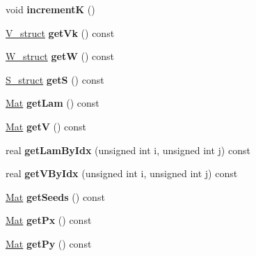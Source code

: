 \begin{DoxyCompactItemize}
void {\bfseries incrementK} ()
\item 
\mbox{\label{classvd_a090bebdbbff36888934c870daf3dcb36}} 
\mbox{\hyperlink{structV__struct}{V\+\_\+struct}} {\bfseries get\+Vk} () const
\item 
\mbox{\label{classvd_ab4d0d9ea76cedf1a6825b62c9ec2d118}} 
\mbox{\hyperlink{structW__struct}{W\+\_\+struct}} {\bfseries getW} () const
\item 
\mbox{\label{classvd_a6b1b73738e720c8ffa2351841c44eabb}} 
\mbox{\hyperlink{structS__struct}{S\+\_\+struct}} {\bfseries getS} () const
\item 
\mbox{\label{classvd_a37c4ab12669eb276fe7fa4a610310345}} 
\mbox{\hyperlink{aux_8h_aa1fe91b8cd36c618282eb0d548690c4c}{Mat}} {\bfseries get\+Lam} () const
\item 
\mbox{\label{classvd_aad4ea5c045b8380f83b0490af2fee0fa}} 
\mbox{\hyperlink{aux_8h_aa1fe91b8cd36c618282eb0d548690c4c}{Mat}} {\bfseries getV} () const
\item 
\mbox{\label{classvd_a1f2400a9f98f649367239f942e3035e8}} 
real {\bfseries get\+Lam\+By\+Idx} (unsigned int i, unsigned int j) const
\item 
\mbox{\label{classvd_af5dbddcd8db66e57e17c4ca65f0a1a0c}} 
real {\bfseries get\+V\+By\+Idx} (unsigned int i, unsigned int j) const
\item 
\mbox{\label{classvd_a82f353c594c3c6b24f6077398f059d3a}} 
\mbox{\hyperlink{aux_8h_aa1fe91b8cd36c618282eb0d548690c4c}{Mat}} {\bfseries get\+Seeds} () const
\item 
\mbox{\label{classvd_aeba6d318016c8f8b9537ce4c0314f8cd}} 
\mbox{\hyperlink{aux_8h_aa1fe91b8cd36c618282eb0d548690c4c}{Mat}} {\bfseries get\+Px} () const
\item 
\mbox{\label{classvd_a9738711704b1d03cdbe027b1976cb0c6}} 
\mbox{\hyperlink{aux_8h_aa1fe91b8cd36c618282eb0d548690c4c}{Mat}} {\bfseries get\+Py} () const
\item 
\mbox{\label{classvd_a624f53ae4a7012f267111359e9245f81}} 

\end{DoxyCompactItemize}
